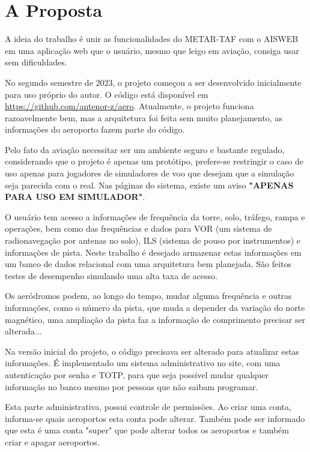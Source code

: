 \chapter{A Proposta}
A ideia do trabalho é unir as funcionalidades do METAR-TAF com o AISWEB em uma 
aplicação web que o usuário, mesmo que leigo em aviação, consiga usar sem 
dificuldades.

No segundo semestre de 2023, o projeto começou a ser desenvolvido inicialmente para uso próprio do autor.
O código está disponível em \url{https://github.com/antenor-z/aero}. Atualmente, o
projeto funciona razoavelmente bem, mas a arquitetura foi feita sem muito planejamento, as
informações do aeroporto fazem parte do código.

Pelo fato da aviação necessitar ser um ambiente seguro e bastante regulado, considerando
que o projeto é apenas um protótipo, prefere-se restringir o caso de uso apenas
para jogadores de simuladores de voo que desejam que a simulação seja parecida
com o real. Nas páginas do sistema, existe um aviso \textbf{"APENAS PARA USO EM SIMULADOR"}.

O usuário tem acesso a informações de frequência da torre, solo, tráfego, rampa
e operações, bem como das frequências e dados para VOR (um sistema de radionavegação
por antenas no solo), ILS (sistema de pouso por instrumentos) e informações de 
pista. Neste trabalho é desejado armazenar estas informações em um banco de dados relacional com 
uma arquitetura bem planejada. São feitos testes de desempenho simulando uma alta taxa 
de acesso.

Os aeródromos podem, ao longo do tempo, mudar alguma frequência e outras
informações, como o número da pista, que muda a depender da variação do norte 
magnético, uma ampliação da pista faz a informação de comprimento precisar ser 
alterada...

Na versão inicial do projeto, o código precisava ser alterado para atualizar estas informações. É implementado
 um sistema administrativo no site, com uma autenticação por senha e TOTP, para 
 que seja possível mudar qualquer informação no banco mesmo por pessoas que não 
 saibam programar.

Esta parte administrativa, possui controle de permissões. Ao criar uma conta, 
informa-se quais aeroportos esta conta pode alterar. Também pode ser informado que
  esta é uma conta "super" que pode alterar todos os aeroportos e também criar e 
  apagar aeroportos.
